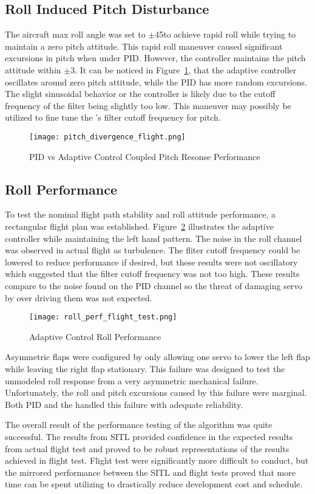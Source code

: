 \subsection{Roll Induced Pitch Disturbance}
The aircraft max roll angle was set to $\pm$45\degrees to achieve rapid roll while trying to maintain a zero pitch attitude.  This rapid roll maneuver caused significant excursions in pitch when under \ac{PID}.  However, the \Lone controller maintains the pitch attitude within $\pm$3\degrees.  It can be noticed in Figure~\ref{fig:pitch_divergence_flight}, that the adaptive controller oscillates around zero pitch attitude, while the \ac{PID} has more random excursions.  The slight sinusoidal behavior or the \Lone controller is likely due to the cutoff frequency of the filter being slightly too low.  This maneuver may possibly be utilized to fine tune the \Lone's filter cutoff frequency for pitch.
\begin{figure}[h!]
 \centering
  \texttt{[image: pitch\_divergence\_flight.png]}
  \caption{PID vs \Lone Adaptive Control Coupled Pitch Resonse Performance}
  \label{fig:pitch_divergence_flight}
\end{figure}

\subsection{Roll Performance}
To test the nominal flight path stability and roll attitude performance, a rectangular flight plan was established.  Figure~\ref{fig:roll_perf_flight_test} illustrates the \Lone adaptive controller while maintaining the left hand pattern.  The noise in the roll channel was observed in actual flight as turbulence.  The fliter cutoff frequency could be lowered to reduce performance if desired, but these results were not oscillatory which suggested that the filter cutoff frequency was not too high.  These results compare to the noise found on the \ac{PID} channel so the threat of damaging servo by over driving them was not expected.
\begin{figure}[h!]
 \centering
  \texttt{[image: roll\_perf\_flight\_test.png]}
  \caption{\Lone Adaptive Control Roll Performance}
  \label{fig:roll_perf_flight_test}
\end{figure}

Asymmetric flaps were configured by only allowing one servo to lower the left flap while leaving the right flap stationary.  This failure was designed to test the unmodeled roll response from a very asymmetric mechanical failure.  Unfortunately, the roll and pitch excursions caused by this failure were marginal.  Both \ac{PID} and the \Lone handled this failure with adequate reliability. 

The overall result of the performance testing of the \Lone algorithm was quite successful.  The results from \ac{SITL} provided confidence in the expected results from actual flight test and proved to be robust representations of the results achieved in flight test.  Flight test were significantly more difficult to conduct, but the mirrored performance between the \ac{SITL} and flight tests proved that more time can be spent utilizing  to drastically reduce development cost and schedule.
